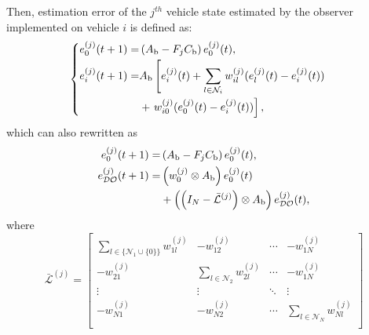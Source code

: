 \documentclass[letterpaper, 10pt, conference]{ieeeconf}  %
\def\L{\mathcal{L}} %
\def\DO{\mathcal{DO}} %
\begin{document}
Then, estimation error of the $j^{th}$ vehicle state estimated by the observer implemented on vehicle $i$ is defined as: 
\begin{equation}
\begin{cases}
    \begin{aligned}
        e_0^{(j)}(t+1) =& \left( A_{\text{b}} - F_{j} C_{\text{b}}  \right) e_0^{(j)}(t), \\
        e_i^{(j)}(t+1) =& A_{\text{b}}\left[e_i^{(j)}(t) + \sum_{l \in \mathcal{N}_i} w_{il}^{(j)} (e_l^{(j)}(t) - e_i^{(j)}(t))\right. \notag \\
    &+\left.  w_{i0}^{(j)}(e_0^{(j)}(t) - e_i^{(j)}(t))\right],
    \end{aligned}
\end{cases}
 \end{equation}
which can also rewritten as
\begin{subequations}
    \begin{align}
        e_0^{(j)}(t+1) =& \left( A_{\text{b}} - F_{j} C_{\text{b}}  \right) e_0^{(j)}(t), \label{eq_e0}\\
        e_{\DO}^{(j)}(t+1) =& \left( w_{0}^{(j)} \otimes A_{\text{b}} \right) e_0^{(j)}(t) \notag \\
        &+ \left( \left( I_{N} - \bar{\L}^{(j)}  \right)  \otimes  A_{\text{b}} \right) e_{\DO}^{(j)}(t),
    \end{align}
    \label{eq_error}
 \end{subequations}
where
\begin{equation*}
    \bar{\L}^{(j)} = \begin{bmatrix}
           \sum_{l \in  \{\mathcal{N}_1 \cup \{ 0 \}\}} w_{1l}^{(j)} & -w_{12}^{(j)} & \cdots & -w_{1N}^{(j)} \\
            -w_{21}^{(j)} & \sum_{l \in \mathcal{N}_2}w_{2l}^{(j)} & \cdots & -w_{1N}^{(j)} \\
           \vdots & \vdots & \ddots & \vdots \\
            -w_{N1}^{(j)} & -w_{N2}^{(j)}& \cdots & \sum_{l \in \mathcal{N}_N}w_{Nl}^{(j)} \\
        \end{bmatrix}
\end{equation*}
\end{document}
